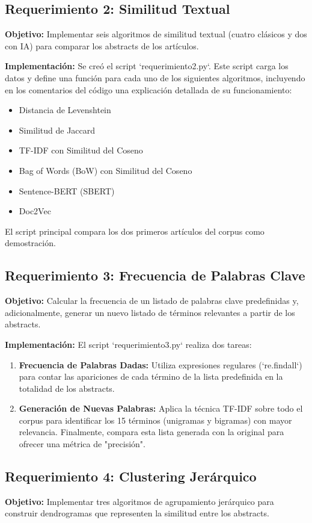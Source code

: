 \documentclass[12pt, a4paper]{article}
\begin{document}
\subsection{Requerimiento 2: Similitud Textual}
\textbf{Objetivo:} Implementar seis algoritmos de similitud textual (cuatro clásicos y dos con IA) para comparar los abstracts de los artículos.

\textbf{Implementación:} Se creó el script `requerimiento2.py`. Este script carga los datos y define una función para cada uno de los siguientes algoritmos, incluyendo en los comentarios del código una explicación detallada de su funcionamiento:
\begin{itemize}
    \item Distancia de Levenshtein
    \item Similitud de Jaccard
    \item TF-IDF con Similitud del Coseno
    \item Bag of Words (BoW) con Similitud del Coseno
    \item Sentence-BERT (SBERT)
    \item Doc2Vec
\end{itemize}
El script principal compara los dos primeros artículos del corpus como demostración.

\subsection{Requerimiento 3: Frecuencia de Palabras Clave}
\textbf{Objetivo:} Calcular la frecuencia de un listado de palabras clave predefinidas y, adicionalmente, generar un nuevo listado de términos relevantes a partir de los abstracts.

\textbf{Implementación:} El script `requerimiento3.py` realiza dos tareas:
\begin{enumerate}
    \item \textbf{Frecuencia de Palabras Dadas:} Utiliza expresiones regulares (`re.findall`) para contar las apariciones de cada término de la lista predefinida en la totalidad de los abstracts.
    \item \textbf{Generación de Nuevas Palabras:} Aplica la técnica TF-IDF sobre todo el corpus para identificar los 15 términos (unigramas y bigramas) con mayor relevancia. Finalmente, compara esta lista generada con la original para ofrecer una métrica de "precisión".
\end{enumerate}

\subsection{Requerimiento 4: Clustering Jerárquico}
\textbf{Objetivo:} Implementar tres algoritmos de agrupamiento jerárquico para construir dendrogramas que representen la similitud entre los abstracts.
\end{document}
